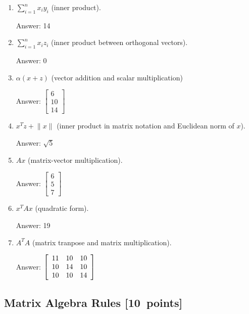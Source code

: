 \documentclass{article}
\newenvironment{answer}{\par\begingroup\color{gre}Answer: }{\endgroup}
\newcommand\pts[1]{\textcolor{pointscolour}{[#1~points]}}
\newcommand{\norm}[1]{\lVert #1 \rVert}
\begin{document}
  \begin{enumerate}
  \item $\sum_{i=1}^n x_iy_i$ (inner product).
  \begin{answer}
  14
  \end{answer}
  \item $\sum_{i=1}^n x_i z_i$ (inner product between orthogonal vectors).
  \begin{answer}
  0
  \end{answer}
  \item $\alpha(x+z)$ (vector addition and scalar multiplication)
  \begin{answer}
  $
  \left[
	\begin{array} { c }
	6 \\
	10 \\
	14
    \end{array}
  \right]
  $
  \end{answer}
  \item $x^Tz + \norm{x}$ (inner product in matrix notation and Euclidean norm of $x$).
  \begin{answer}
  $\sqrt{5}$
  \end{answer}
  \item $Ax$ (matrix-vector multiplication).
  \begin{answer}
  $
  \left[
    \begin{array} { c }
    6 \\
    5 \\
    7
    \end{array}
  \right]
  $
  \end{answer}
  \item $x^TAx$ (quadratic form).
  \begin{answer}
  19
  \end{answer}
  \item $A^TA$ (matrix tranpose and matrix multiplication).
  \begin{answer}
    $
  \left[
    \begin{array} { c c c }
    11 & 10 & 10 \\
    10 & 14 & 10 \\
    10 & 10 & 14
    \end{array}
  \right]
  $
  \end{answer}
  \end{enumerate}

  \subsection{Matrix Algebra Rules \pts{10}}
\end{document}

